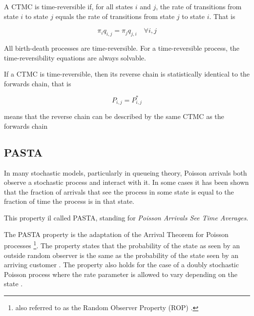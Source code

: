 \begin{definition}
\label{def:time-reversibility}

	A CTMC is time-reversible if, for all states $i$ and $j$, the rate of transitions from state $i$ to state $j$ equals the rate of transitions from state $j$ to state $i$. That is
	
	\begin{equation}
		\pi_{i} q_{i,j} = \pi_{j} q_{j,i} \quad \forall i,j
	\end{equation}
\end{definition}

All birth-death processes are time-reversible.
For a time-reversible process, the time-reversibility equations are always solvable.

\begin{theorem}
\label{thm:statistical-description-time-reversible}

	If a CTMC is time-reversible, then its reverse chain is statistically identical to the forwards chain, that is
		
	\begin{equation}
	\label{eqn:statistical-description-time-reversible}
	P_{i,j} = P_{i,j}^{*}
	\end{equation}
\end{theorem}

 means that the reverse chain can be described by the same CTMC as the forwards chain




\subsection{PASTA}
\label{sec:pasta}

In many stochastic models, particularly in queueing theory, Poisson arrivals both observe a stochastic process and interact with it. In some cases it has been shown that the fraction of arrivals that see the process in some state is equal to the fraction of time the process is in that state.

This property il called PASTA, standing for \textit{Poisson Arrivals See Time Averages}.

The PASTA property is the adaptation of the Arrival Theorem for Poisson processes \cite{asmussen2003queueing,el2012sample} \footnote{also referred to as the Random Observer Property (ROP) \cite{el2012sample}.}. 
The property states that the probability of the state as seen by an outside random observer is the same as the probability of the state seen by an arriving customer \cite{wolff1982poisson}. 
The property also holds for the case of a doubly stochastic Poisson process where the rate parameter is allowed to vary depending on the state \cite{van1988conditional}.

